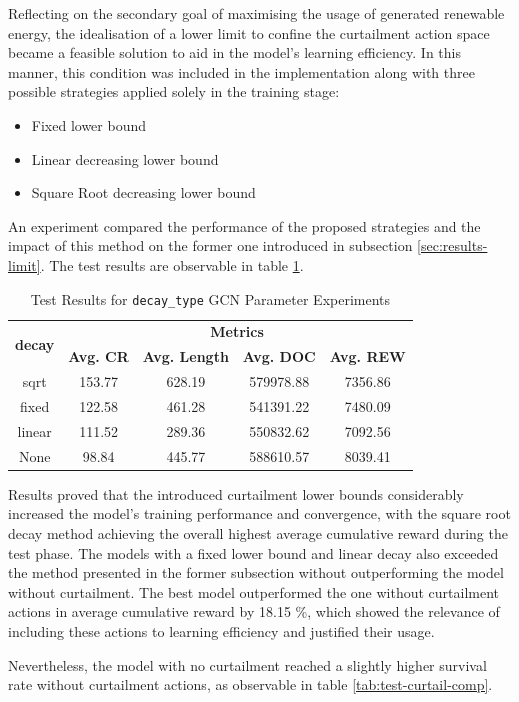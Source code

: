 Reflecting on the secondary goal of maximising the usage of generated renewable energy, the idealisation of a lower limit to confine the curtailment action space became a feasible solution to aid in the model's learning efficiency. In this manner, this condition was included in the implementation along with three possible strategies applied solely in the training stage:
\begin{itemize}
	\item Fixed lower bound
	\item Linear decreasing lower bound
	\item Square Root decreasing lower bound
\end{itemize}


An experiment compared the performance of the proposed strategies and the impact of this method on the former one introduced in subsection \ref{sec:results-limit}. The test results are observable in table \ref{tab:test-decay}.

\begin{table}[h!]
	\centering
	\caption{Test Results for \texttt{decay\_type} \ac{GCN} Parameter Experiments}
	\begin{tabular}{ccccc}
		\toprule
		  \multirow{2}{*}{\textbf{decay}} & \multicolumn{4}{c}{\textbf{Metrics}} \\ 
		\cmidrule(lr){2-5}
		& \textbf{Avg. CR} & \textbf{Avg. Length} & \textbf{Avg. DOC} & \textbf{Avg. REW} \\ 
		\midrule
		sqrt & 153.77 & 628.19 & 579978.88 & 7356.86 \\
		fixed & 122.58 & 461.28 & 541391.22 & 7480.09 \\
		linear & 111.52 & 289.36 & 550832.62 & 7092.56 \\
		None & 98.84 & 445.77 & 588610.57 & 8039.41 \\
		\bottomrule
	\end{tabular}
	\label{tab:test-decay}
\end{table}

Results proved that the introduced curtailment lower bounds considerably increased the model's training performance and convergence, with the square root decay method achieving the overall highest average cumulative reward during the test phase. The models with a fixed lower bound and linear decay also exceeded the method presented in the former subsection without outperforming the model without curtailment. The best model outperformed the one without curtailment actions in average cumulative reward by 18.15 \%, which showed the relevance of including these actions to learning efficiency and justified their usage.\par
Nevertheless, the model with no curtailment reached a slightly higher survival rate without curtailment actions, as observable in table \ref{tab:test-curtail-comp}.


